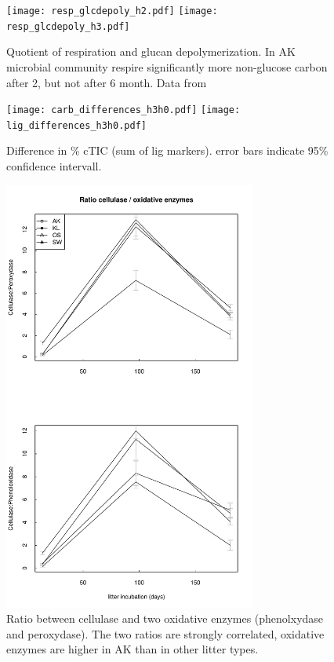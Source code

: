 \documentclass[journal abbreviation]{copernicus}
\begin{document}
\begin{figure}[t]
\vspace*{2mm}
\begin{center}
\texttt{[image: resp\_glcdepoly\_h2.pdf]}
\texttt{[image: resp\_glcdepoly\_h3.pdf]}
\end{center}
\label{resp_depoly}
\caption{Quotient of respiration and glucan depolymerization. In AK microbial community respire significantly more non-glucose carbon after 2, but not after 6 month. Data from \cite{Leitner2011}}
\end{figure}

\begin{figure}[t]
\vspace*{2mm}
\begin{center}
\texttt{[image: carb\_differences\_h3h0.pdf]}
\texttt{[image: lig\_differences\_h3h0.pdf]}
\end{center}
\label{car_lig_6month}
\caption{Difference in \% cTIC (sum of lig markers). error bars indicate 95\% confidence intervall.}
\end{figure}

\begin{figure}[t]
\vspace*{2mm}
\begin{center}
\includegraphics[width=8.3cm]{enzymeratio.pdf}
\end{center}
\label{enz_ratio}
\caption{Ratio between cellulase and two oxidative enzymes (phenolxydase and peroxydase). The two ratios are strongly correlated, oxidative enzymes are higher in AK than in other litter types.}
\end{figure}
\end{document}
